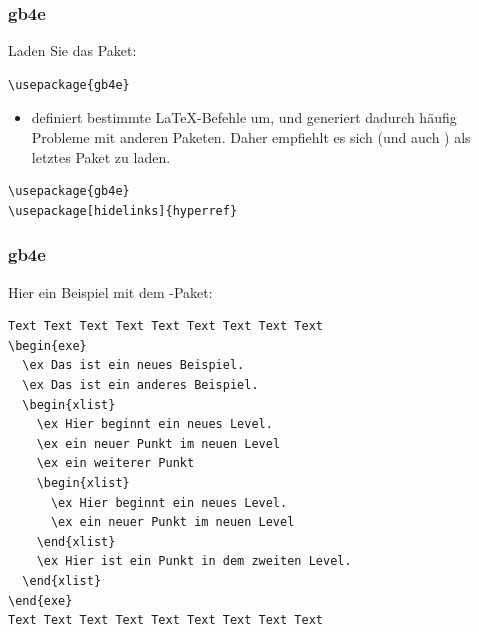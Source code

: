 \begin{frame}[fragile]
\frametitle{gb4e}

Laden Sie das Paket:

\begin{lstlisting}
\usepackage{gb4e}
\end{lstlisting}

\begin{itemize}
	\item {} definiert bestimmte \LaTeX -Befehle um, und generiert dadurch häufig Probleme mit anderen Paketen. Daher empfiehlt es sich  (und auch ) als letztes Paket zu laden.
\end{itemize}

\begin{lstlisting}
\usepackage{gb4e}
\usepackage[hidelinks]{hyperref}
\end{lstlisting}

\end{frame}


\begin{frame}[fragile]

\frametitle{gb4e}

Hier ein Beispiel mit dem -Paket:
{\footnotesize 
	\begin{lstlisting}
Text Text Text Text Text Text Text Text Text 
\begin{exe}
  \ex Das ist ein neues Beispiel. 	
  \ex Das ist ein anderes Beispiel.
  \begin{xlist}
    \ex Hier beginnt ein neues Level.
    \ex ein neuer Punkt im neuen Level
    \ex ein weiterer Punkt
    \begin{xlist}
      \ex Hier beginnt ein neues Level.
      \ex ein neuer Punkt im neuen Level
    \end{xlist}
    \ex Hier ist ein Punkt in dem zweiten Level.
  \end{xlist}		
\end{exe}	
Text Text Text Text Text Text Text Text Text 
\end{lstlisting}
}
\end{frame}

